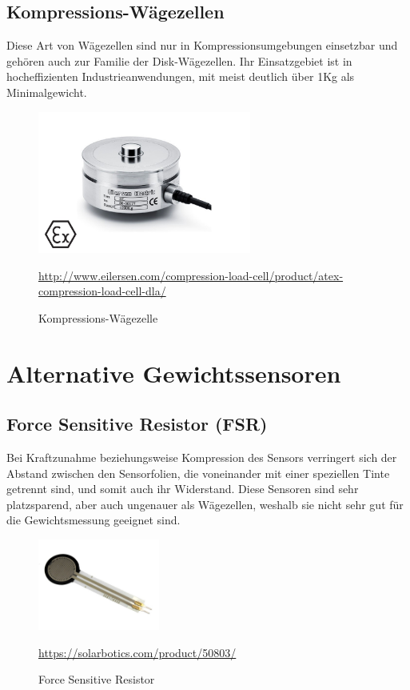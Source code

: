 \subsection{Kompressions-Wägezellen}
Diese Art von Wägezellen sind nur in Kompressionsumgebungen einsetzbar und gehören auch zur Familie der Disk-Wägezellen. Ihr Einsatzgebiet ist in hocheffizienten Industrieanwendungen, mit meist deutlich über 1Kg als Minimalgewicht.
\begin{figure}[H]
    \center
    \includegraphics[width=7cm]{Bilder/waegezelle-kompression.jpg}\\
    \caption{Kompressions-Wägezelle}
    \begin{center} \quelle\url{http://www.eilersen.com/compression-load-cell/product/atex-compression-load-cell-dla/} \end{center}
\end{figure}
\newpage
\section{Alternative Gewichtssensoren}
\label{sec:alternative-gewichtssensoren}
\subsection{Force Sensitive Resistor (FSR)}
Bei Kraftzunahme beziehungsweise Kompression des Sensors verringert sich der Abstand zwischen den Sensorfolien, die voneinander mit einer speziellen Tinte getrennt sind, und somit auch ihr Widerstand. Diese Sensoren sind sehr platzsparend, aber auch ungenauer als Wägezellen, weshalb sie nicht sehr gut für die Gewichtsmessung geeignet sind.
\begin{figure}[H]
    \center
    \includegraphics[width=4cm]{Bilder/waegezelle-force.jpg}\\
    \caption{Force Sensitive Resistor}
    \begin{center} \quelle\url{https://solarbotics.com/product/50803/} \end{center}
\end{figure}
